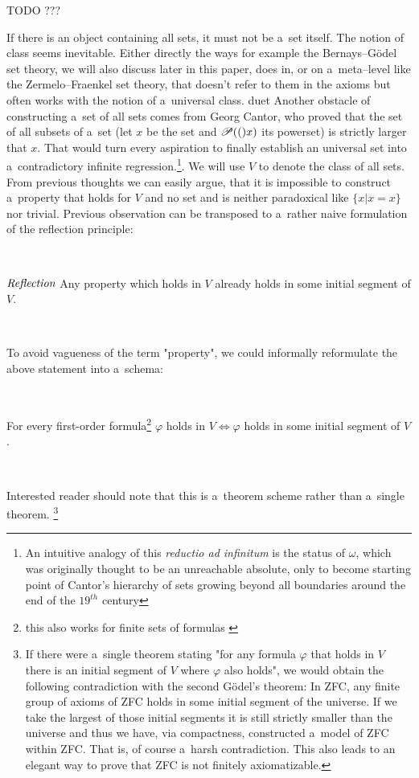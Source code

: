 TODO ???

If there is an object containing all sets, it must not be a~set itself. The notion of class seems inevitable. Either directly the ways for example the Bernays–Gödel set theory, we will also discuss later in this paper, does in, or on a~meta–level like the Zermelo–Fraenkel set theory, that doesn't refer to them in the axioms but often works with the notion of a~universal class.
duet
Another obstacle of constructing a~set of all sets comes from Georg Cantor, who proved that the set of all subsets of a~set (let $x$ be the set and $\mathscr{P} (()x)$ its powerset) is strictly larger that $x$. That would turn every aspiration to finally establish an universal set into a~contradictory infinite regression.\footnote{An intuitive analogy of this \emph{reductio ad infinitum} is the status of $\omega$, which was originally thought to be an unreachable absolute, only to become starting point of Cantor's hierarchy of sets growing beyond all boundaries around the end of the $19^{th}$ century}. We will use $V$ to denote the class of all sets. %
From previous thoughts we can easily argue, that it is impossible to construct a~property that holds for $V$ and no set and is neither paradoxical like $\{x  |  x = x\}$ nor trivial. Previous observation can be transposed to a~rather naive formulation of the reflection principle:


\

$\emph{Reflection}$ Any property which holds in $V$ already holds in some initial segment of $V$. 

\

To avoid vagueness of the term "property", we could informally reformulate the above statement into a~schema: 

\

For every first-order formula\footnote{this also works for finite sets of formulas \cite[p.~168]{JechBook}} $\varphi$ holds in $V \iff \varphi$ holds in some initial segment of $V$.

\

Interested reader should note that this is a~theorem scheme rather than a~single theorem. \footnote{If there were a~single theorem stating "for any formula $\varphi$ that holds in $V$ there is an initial segment of $V$ where $\varphi$ also holds", we would obtain the following contradiction with the second G{\"o}del's theorem: In ZFC, any finite group of axioms of ZFC holds in some initial segment of the universe. If we take the largest of those initial segments it is still strictly smaller than the universe and thus we have, via compactness, constructed a~model of ZFC within ZFC. That is, of course a~harsh contradiction. This also leads to an elegant way to prove that ZFC is not finitely axiomatizable.}

